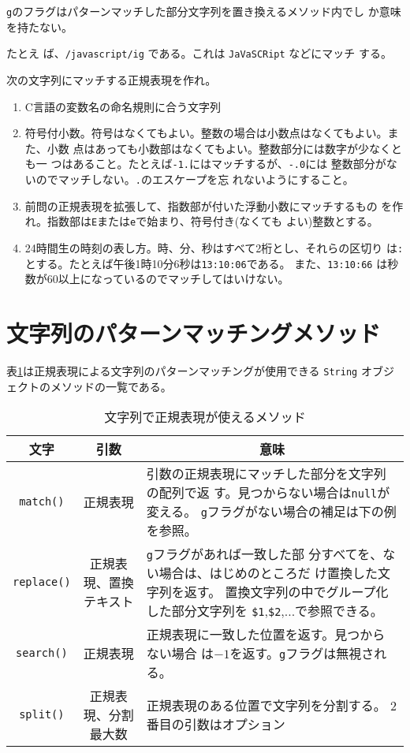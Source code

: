 \verb+g+のフラグはパターンマッチした部分文字列を置き換えるメソッド内でし
か意味を持たない。

たとえ
ば、\verb+/javascript/ig+ である。これは \verb+JaVaSCRipt+ などにマッチ
する。
\begin{Prob}\upshape
次の文字列にマッチする正規表現を作れ。
\begin{enumerate}
 \item C言語の変数名の命名規則に合う文字列
 \item 符号付小数。符号はなくてもよい。整数の場合は小数点はなくてもよい。また、小数
       点はあっても小数部はなくてもよい。整数部分には数字が少なくとも一
       つはあること。たとえば\verb+-1.+にはマッチするが、\verb+-.0+には
       整数部分がないのでマッチしない。\verb+.+のエスケープを忘
       れないようにすること。
 \item 前問の正規表現を拡張して、指数部が付いた浮動小数にマッチするもの
       を作れ。指数部は\verb+E+または\verb+e+で始まり、符号付き(なくても
       よい)整数とする。
 \item 24時間生の時刻の表し方。時、分、秒はすべて2桁とし、それらの区切り
       は\verb+:+とする。たとえば午後1時10分6秒は\verb+13:10:06+である。
  また、\verb+13:10:66+ は秒数が60以上になっているのでマッチしてはいけない。
\end{enumerate}
\end{Prob}
\section{文字列のパターンマッチングメソッド}
表\ref{RegMwthod}は正規表現による文字列のパターンマッチングが使用できる \verb+String+
オブジェクトのメソッドの一覧である。
\begin{table}[ht]
\caption{文字列で正規表現が使えるメソッド}\label{RegMwthod}
\begin{center}
 \begin{tabular}{|c|c|m{}|}\hline
  文字&\multicolumn{1}{c|}{引数}&\multicolumn{1}{c|}{意味}\\\hline
\verb+match()+&正規表現&引数の正規表現にマッチした部分を文字列の配列で返
	  す。見つからない場合は\verb+null+が変える。
          \verb+g+フラグがない場合の補足は下の例を参照。\\\hline
\verb+replace()+&正規表現、\newline 置換テキスト&\verb+g+フラグがあれば一致した部
	  分すべてを、ない場合は、はじめのところだ
	  け置換した文字列を返す。\newline
          置換文字列の中でグループ化した部分文字列を
	  \verb+$1+,\verb+$2+,...で参照できる。\\\hline
\verb+search()+&正規表現&正規表現に一致した位置を返す。見つからない場合
	  は$-1$を返す。\verb+g+フラグは無視される。\\\hline
\verb+split()+&正規表現、\newline 分割最大数&正規表現のある位置で文字列を分割する。
	  2番目の引数はオプション\\\hline
\end{tabular}
\end{center}
\end{table}

